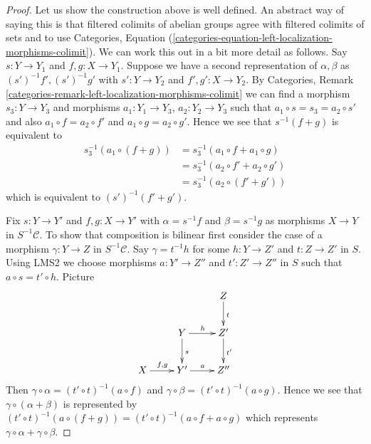 \begin{proof}
\medskip\noindent
Let us show the construction above is well defined.
An abstract way of saying this is that filtered colimits of
abelian groups agree with filtered colimits of sets and to use
Categories,
Equation (\ref{categories-equation-left-localization-morphisms-colimit}).
We can work this out in a bit more detail as follows.
Say $s : Y \to Y_1$ and $f, g : X \to Y_1$. Suppose we have a second
representation of $\alpha, \beta$ as $(s')^{-1}f', (s')^{-1}g'$ with
$s' : Y \to Y_2$ and $f', g' : X \to Y_2$. By
Categories, Remark \ref{categories-remark-left-localization-morphisms-colimit}
we can find a morphism $s_3 : Y \to Y_3$ and morphisms
$a_1 : Y_1 \to Y_3$, $a_2 : Y_2 \to Y_3$ such that
$a_1 \circ s = s_3 = a_2 \circ s'$ and also
$a_1 \circ f = a_2 \circ f'$ and $a_1 \circ g = a_2 \circ g'$.
Hence we see that $s^{-1}(f + g)$ is equivalent to
\begin{align*}
s_3^{-1}(a_1 \circ (f + g)) & =
s_3^{-1}(a_1 \circ f + a_1 \circ g) \\
& = s_3^{-1}(a_2 \circ f' + a_2 \circ g') \\
& = s_3^{-1}(a_2 \circ (f' + g'))
\end{align*}
which is equivalent to $(s')^{-1}(f' + g')$.

\medskip\noindent
Fix $s : Y \to Y'$ and $f, g : X \to Y'$ with
$\alpha = s^{-1}f$ and $\beta = s^{-1}g$ as morphisms $X \to Y$
in $S^{-1}\mathcal{C}$.
To show that composition is bilinear first consider the case of a
morphism $\gamma : Y \to Z$ in $S^{-1}\mathcal{C}$. Say $\gamma = t^{-1}h$
for some $h : Y \to Z'$ and $t : Z \to Z'$ in $S$. Using LMS2 we
choose morphisms $a : Y' \to Z''$ and $t' : Z' \to Z''$ in $S$ such
that $a \circ s = t' \circ h$. Picture
$$
\xymatrix{
& & Z \ar[d]^t \\
& Y \ar[r]^h \ar[d]^s & Z' \ar[d]^{t'} \\
X \ar[r]^{f, g} & Y' \ar[r]^a & Z''
}
$$
Then
$\gamma \circ \alpha = (t' \circ t)^{-1}(a \circ f)$ and
$\gamma \circ \beta = (t' \circ t)^{-1}(a \circ g)$.
Hence we see that $\gamma \circ (\alpha + \beta)$ is represented
by $(t' \circ t)^{-1}(a \circ (f + g)) =
(t' \circ t)^{-1}(a \circ f + a \circ g)$ which represents
$\gamma \circ \alpha + \gamma \circ \beta$.


\end{proof}

